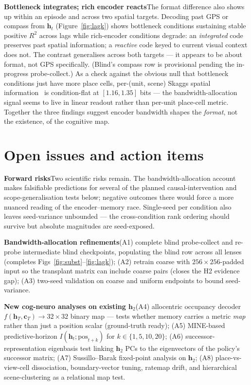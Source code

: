 \documentclass[10pt,conference,compsocconf]{IEEEtran}
\begin{document}
\noindent\textbf{Bottleneck integrates; rich encoder reacts}\quad The format difference also shows up within an episode and across two spatial targets. Decoding past GPS or compass from $\mathbf{h}_t$ (Figure~\ref{fig:lagk}) shows bottleneck conditions sustaining stable positive $R^2$ across lags while rich-encoder conditions degrade: an \emph{integrated} code preserves past spatial information; a \emph{reactive} code keyed to current visual context does not. The contrast generalises across both targets --- it appears to be about format, not GPS specifically. (Blind's compass row is provisional pending the in-progress probe-collect.) As a check against the obvious null that bottleneck conditions just have more place cells, per-(unit, scene) Skaggs spatial information~\cite{wijmans2023emergence} is condition-flat at $[1.16, 1.35]$ bits --- the bandwidth-allocation signal seems to live in linear readout rather than per-unit place-cell metric. Together the three findings suggest encoder bandwidth shapes the \emph{format}, not the existence, of the cognitive map.

\section{Open issues and action items}
\label{sec:open}

\textbf{Forward risks}\quad Two scientific risks remain. The bandwidth-allocation account makes falsifiable predictions for several of the planned causal-intervention and scope-generalisation tests below; negative outcomes there would force a more nuanced reading of the encoder--memory race. Single-seed per condition also leaves seed-variance unbounded --- the cross-condition rank ordering should survive but absolute magnitudes are seed-exposed.

\textbf{Bandwidth-allocation refinements}\quad (A1) complete blind probe-collect and re-probe intermediate blind checkpoints, populating the blind row across all lenses (completes Figs~\ref{fig:subst}--\ref{fig:lagk}); (A2) retrain coarse with $256{\times}256$-padded input so the transplant matrix can include coarse pairs (closes the H2 evidence gap); (A3) two-seed validation on coarse and uniform endpoints to bound seed-variance.

\textbf{New cog-neuro analyses on existing $\mathbf{h}_2$}\quad (A4) allocentric occupancy decoder $f(\mathbf{h}_T,\mathbf{c}_T) \to 32{\times}32$ binary map --- tests whether memory carries a metric \emph{map} rather than just a position scalar (ground-truth ready); (A5) MINE-based predictive-horizon $I(\mathbf{h}_t; \text{pos}_{t+k})$ for $k \in \{1,5,10,20\}$; (A6) successor-representation eigenbasis test linking $\mathbf{h}_2$ PCs to the eigenvectors of the policy's successor matrix; (A7) Sussillo--Barak fixed-point analysis on $\mathbf{h}_2$; (A8) place-vs-view-cell dissociation, boundary-vector tuning, ratemap drift, and hierarchical scene-clustering as a relational map test.
\end{document}

